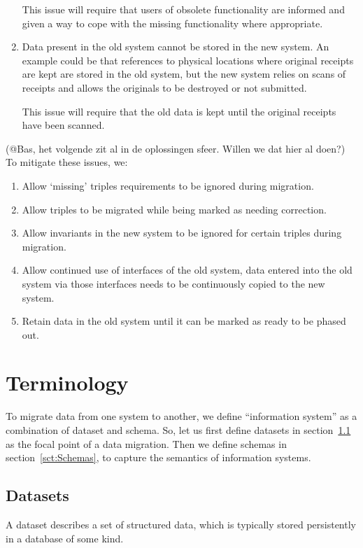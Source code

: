 \documentclass{elsarticle}
\begin{document}
\begin{enumerate}
   This issue will require that users of obsolete functionality are informed and given a way to cope with the missing functionality where appropriate.
\item Data present in the old system cannot be stored in the new system.
   An example could be that references to physical locations where original receipts are kept are stored in the old system,
   but the new system relies on scans of receipts and allows the originals to be destroyed or not submitted.

   This issue will require that the old data is kept until the original receipts have been scanned.
\end{enumerate}

(@Bas, het volgende zit al in de oplossingen sfeer. Willen we dat hier al doen?)
   To mitigate these issues, we:
   
   \begin{enumerate}
   \item Allow `missing' triples requirements to be ignored during migration.
   \item Allow triples to be migrated while being marked as needing correction.
   \item Allow invariants in the new system to be ignored for certain triples during migration.
   \item Allow continued use of interfaces of the old system, data entered into the old system via those interfaces needs to be continuously copied to the new system.
   \item Retain data in the old system until it can be marked as ready to be phased out.
   \end{enumerate}   

\section{Terminology}
\label{sct:Terminology}
   To migrate data from one system to another,
   we define ``information system'' as a combination of dataset and schema.
   So, let us first define datasets in section~\ref{sct:Datasets} as the focal point of a data migration.
   Then we define schemas in section~\ref{sct:Schemas}, to capture the semantics of information systems.

\subsection{Datasets}
\label{sct:Datasets}
   A dataset describes a set of structured data, which is typically stored persistently in a database of some kind.
\end{document}
